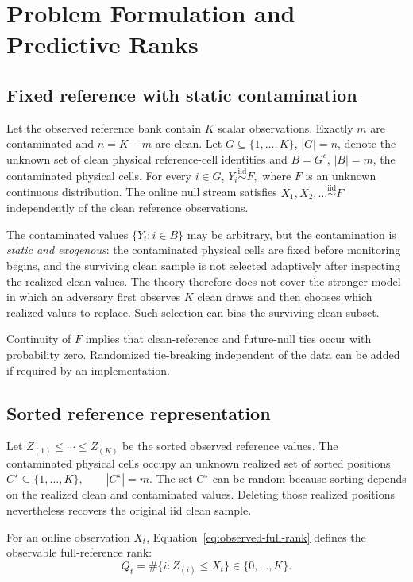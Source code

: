 \section{Problem Formulation and Predictive Ranks}

\subsection{Fixed reference with static contamination}

Let the observed reference bank contain \(K\) scalar observations. Exactly \(m\) are contaminated and
\(n=K-m\)
are clean. Let \(G\subseteq\{1,\ldots,K\}\), \(|G|=n\), denote the unknown set of clean physical reference-cell identities and \(B=G^c\), \(|B|=m\), the contaminated physical cells. For every \(i\in G\),
\(Y_i\overset{\mathrm{iid}}{\sim}F,\)
where \(F\) is an unknown continuous distribution. The online null stream satisfies
\(X_1,X_2,\ldots\overset{\mathrm{iid}}{\sim}F\)
independently of the clean reference observations.

The contaminated values \(\{Y_i:i\in B\}\) may be arbitrary, but the contamination is \emph{static and exogenous}: the contaminated physical cells are fixed before monitoring begins, and the surviving clean sample is not selected adaptively after inspecting the realized clean values. The theory therefore does not cover the stronger model in which an adversary first observes \(K\) clean draws and then chooses which realized values to replace. Such selection can bias the surviving clean subset.

Continuity of \(F\) implies that clean-reference and future-null ties occur with probability zero. Randomized tie-breaking independent of the data can be added if required by an implementation.

\subsection{Sorted reference representation}

Let
\(Z_{(1)}\le\cdots\le Z_{(K)}\)
be the sorted observed reference values. The contaminated physical cells occupy an unknown realized set of sorted positions
\(C^\star\subseteq\{1,\ldots,K\}, \qquad |C^\star|=m.\)
The set \(C^\star\) can be random because sorting depends on the realized clean and contaminated values. Deleting those realized positions nevertheless recovers the original iid clean sample.

For an online observation \(X_t\), Equation~\eqref{eq:observed-full-rank} defines the observable full-reference rank:
\begin{equation}
Q_t
  =
  \#\{i:Z_{(i)}\le X_t\}
  \in\{0,\ldots,K\}.
  \label{eq:observed-full-rank}
\end{equation}

